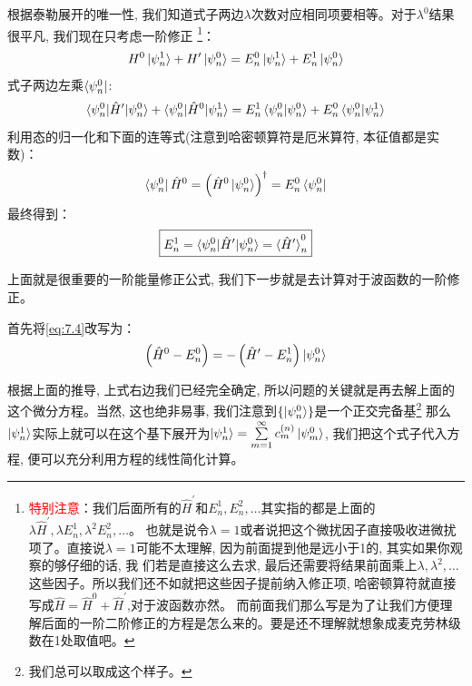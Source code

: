 \documentclass[a4paper,zihao=-4,linespread=1]{ctexrep}
\newenvironment{lequation}{\large\begin{equation}}{\end{equation}}
\begin{document}
    根据泰勒展开的唯一性, 我们知道式子两边$\lambda$次数对应相同项要相等。对于$\lambda^0$结果很平凡, 我们现在只考虑一阶修正
    \footnote{\textcolor{red}{特别注意}：我们后面所有的$\hat{H}^\prime$和$E_n^1,E_n^2,\ldots$其实指的都是上面的$\lambda\hat{H}^\prime,\lambda E_n^1,\lambda^2 E_n^2,\ldots$。
    也就是说令$\lambda=1$或者说把这个微扰因子直接吸收进微扰项了。直接说$\lambda=1$可能不太理解, 因为前面提到他是远小于1的, 其实如果你观察的够仔细的话, 我
    们若是直接这么去求, 最后还需要将结果前面乘上$\lambda,\lambda^2,\ldots$这些因子。所以我们还不如就把这些因子提前纳入修正项, 哈密顿算符就直接写成$\hat{H}=\hat{H}^0+\hat{H}^\prime$,对于波函数亦然。
    而前面我们那么写是为了让我们方便理解后面的一阶二阶修正的方程是怎么来的。要是还不理解就想象成麦克劳林级数在1处取值吧。}：
    \begin{equation}
        \label{eq:7.4}
        H^0 \ket{\psi_n^1}+H^{\prime} \ket{\psi_n^0}=E_n^0 \ket{\psi_n^1}+E_n^1 \ket{\psi_n^0}
    \end{equation}
    式子两边左乘$\bra{\psi_n^0}$:
    \[\braket{\psi_n^0|\hat{H}^\prime|\psi_n^0}+\braket{\psi_n^0|\hat{H}^0|\psi_n^1}=E_n^1\braket{\psi_n^0|\psi_n^0}+E_n^0\braket{\psi_n^0|\psi_n^1}\]
    利用态的归一化和下面的连等式(注意到哈密顿算符是厄米算符, 本征值都是实数)：
    \[
        \bra{\psi_n^0}\hat{H}^0=\left(\hat{H}^0\ket{\psi_n^0}\right)^\dagger=E_n^0\bra{\psi_n^0}
    \]
    最终得到：
    \begin{lequation}
        \label{eq:7.5}
        \boxed{
            E_n^1=\braket{\psi_n^0|\hat{H}^\prime|\psi_n^0}=\braket{\hat{H}^\prime}_n^0
        }
    \end{lequation}
    
    上面就是很重要的一阶能量修正公式, 我们下一步就是去计算对于波函数的一阶修正。

    首先将\ref{eq:7.4}改写为：
    \begin{equation}
        \label{eq:7.6}
        \left(\hat{H}^0-E_n^0\right)=-\left(\hat{H}^\prime-E_n^1\right)\ket{\psi_n^0}
    \end{equation}
    
    根据上面的推导, 上式右边我们已经完全确定, 所以问题的关键就是再去解上面的这个微分方程。当然, 这也绝非易事, 我们注意到$\{\ket{\psi_n^0}\}$是一个正交完备基\footnote{我们总可以取成这个样子。}
    那么$\ket{\psi_n^1}$实际上就可以在这个基下展开为$\ket{\psi_n^1}=\sum\limits_{m=1}^\infty c_m^{(n)}\ket{\psi_m^0}$, 我们把这个式子代入方程, 便可以充分利用方程的线性简化计算。
\end{document}
